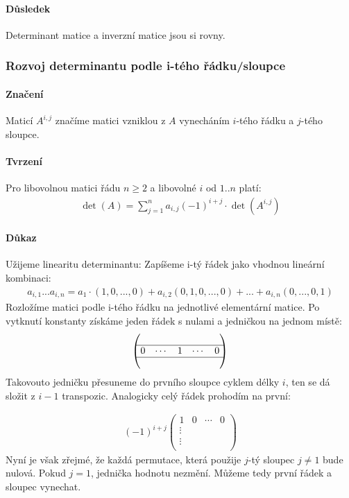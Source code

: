 \documentclass[a4paper,10pt]{article}
\begin{document}
\paragraph{Důsledek}
Determinant matice a inverzní matice jsou si rovny.

\subsubsection{Rozvoj determinantu podle i-tého řádku/sloupce}
\setcounter{equation}{0}
\paragraph{Značení} Maticí $A^{i,j}$ značíme matici vzniklou z $A$ vynecháním $i$-tého
řádku a $j$-tého sloupce.

\paragraph{Tvrzení}
Pro libovolnou matici řádu $n \ge 2$ a libovolné $i$ od $1 .. n$ platí:
\begin{align*}
	\det (A) = \sum_{j=1}^n a_{i,j} (-1)^{i+j} \cdot \det (A^{i,j})
\end{align*}

\paragraph{Důkaz}
Užijeme linearitu determinantu: Zapíšeme i-tý řádek jako vhodnou lineární
kombinaci:
\begin{align}
	a_{i,1}  ... a_{i,n} = a_1 \cdot (1, 0, ... , 0 ) + a_{i,2} (0, 1, 0, ... , 0 ) +
	... + a_{i,n} (0, ... , 0, 1)
\end{align}
Rozložíme matici podle i-tého řádku na jednotlivé elementární matice. Po
vytknutí konstanty získáme jeden řádek s nulami a jedničkou na jednom místě:
\begin{align}
	\left( \begin{matrix}
		 \\
		\hline 0 & \cdots & 1 & \cdots & 0 \\
		\hline  \\
	\end{matrix} \right)
\end{align}
Takovouto jedničku přesuneme do prvního sloupce cyklem délky $i$, ten se dá
složit z $i-1$ transpozic. Analogicky celý řádek prohodím na první:

\begin{align}
	(-1)^{i+j}
	\left( \begin{array}{c|ccc}
		1 & 0 & \cdots & 0 \\
		\hline \vdots  \\
		\vdots   \\
	\end{array} \right)
\end{align}
Nyní je však zřejmé, že každá permutace, která použije $j$-tý sloupec $j\neq1$ bude
nulová. Pokud $j=1$, jednička hodnotu nezmění. Můžeme tedy první řádek a sloupec
vynechat.
\end{document}
